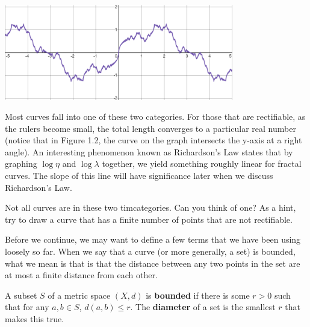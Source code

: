   \begin{center}
    \includegraphics[width=0.75\textwidth]{Images/Chap1/1.1.2.png}
  
  \end{center}

Most curves fall into one of these two categories. For those that are rectifiable, as the rulers become small, the total length converges to a particular real number (notice that in Figure 1.2, the curve on the graph intersects the y-axis at a right angle). An interesting phenomenon known as Richardson's Law states that by graphing $\log\eta$ and $\log\lambda$ together, we yield something roughly linear for fractal curves. The slope of this line will have significance later when we discuss Richardson's Law.\\

\begin{exercise}
    Not all curves are in these two timcategories. Can you think of one? As a hint, try to draw a curve that has a finite number of points that are not rectifiable. 
\end{exercise}

Before we continue, we may want to define a few terms that we have been using loosely so far. When we say that a curve (or more generally, a set) is bounded, what we mean is that is that the distance between any two points in the set are at most a finite distance from each other.\\ 

\begin{definition}
A subset $S$ of a metric space $(X,d)$ is \textbf{bounded} if there is some $r>0$ such that for any $a,b\in S$, $d(a,b)\leq r$. The \textbf{diameter} of a set is the smallest $r$ that makes this true. 
\end{definition}

